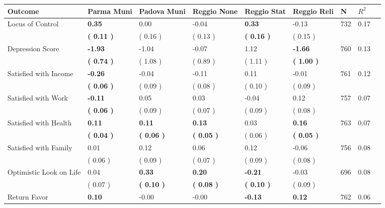 \begin{tabular}{L{6.2cm} C{1.8cm} C{1.8cm} C{1.8cm} C{1.8cm} C{1.8cm} C{1.8cm} C{0.3cm} C{0.3cm}}
\toprule
 \textbf{Outcome} & \textbf{Parma Muni} & \textbf{Padova Muni} & \textbf{Reggio None} & \textbf{Reggio Stat} & \textbf{Reggio Reli} & \textbf{N} & \textbf{$ R^2$} \\
\midrule
Locus of Control & \textbf{     0.35} &      0.00 &     -0.04 & \textbf{     0.33} &     -0.13  & 732 &       0.17 \\ 
 & \textbf{(     0.11 )} & (     0.16 ) & (     0.13 ) & \textbf{(     0.16 )} & (     0.15 )  & \\
Depression Score & \textbf{    -1.93} &     -1.04 &     -0.07 &      1.12 & \textbf{    -1.66}  & 760 &       0.13 \\ 
 & \textbf{(     0.74 )} & (     1.08 ) & (     0.89 ) & (     1.11 ) & \textbf{(     1.00 )}  & \\
Satisfied with Income & \textbf{    -0.26} &     -0.04 &     -0.11 &      0.11 &     -0.01  & 761 &       0.12 \\ 
 & \textbf{(     0.06 )} & (     0.09 ) & (     0.08 ) & (     0.10 ) & (     0.09 )  & \\
Satisfied with Work & \textbf{    -0.11} &      0.05 &      0.03 &     -0.04 &      0.12  & 757 &       0.07 \\ 
 & \textbf{(     0.06 )} & (     0.09 ) & (     0.07 ) & (     0.09 ) & (     0.08 )  & \\
Satisfied with Health & \textbf{     0.11} & \textbf{     0.11} & \textbf{     0.13} &      0.03 & \textbf{     0.16}  & 763 &       0.07 \\ 
 & \textbf{(     0.04 )} & \textbf{(     0.06 )} & \textbf{(     0.05 )} & (     0.06 ) & \textbf{(     0.05 )}  & \\
Satisfied with Family &      0.01 &      0.12 &      0.06 &      0.12 &     -0.06  & 756 &       0.08 \\ 
 & (     0.06 ) & (     0.09 ) & (     0.07 ) & (     0.09 ) & (     0.08 )  & \\
Optimistic Look on Life &      0.04 & \textbf{     0.33} & \textbf{     0.20} & \textbf{    -0.21} &     -0.03  & 696 &       0.08 \\ 
 & (     0.07 ) & \textbf{(     0.10 )} & \textbf{(     0.08 )} & \textbf{(     0.10 )} & (     0.09 )  & \\
Return Favor & \textbf{     0.10} &     -0.00 &     -0.00 & \textbf{    -0.13} & \textbf{     0.12}  & 762 &       0.06 \\ 

\end{tabular}
